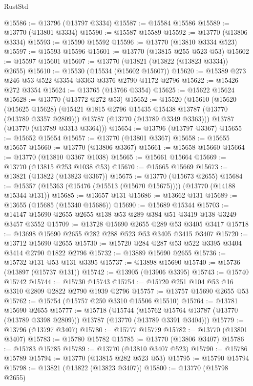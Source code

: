 \begin{lexlean}{RustStd}
\begin{coremodule}
@15586 := @13796 (@13797 @3334)
@15587 := @15584 @15586
@15589 := @13770 (@13801 @3334)
@15590 := @15587 @15589
@15592 := @13770 (@13806 @3334)
@15593 := @15590 @15592
@15596 := @13770 (@13810 @3334 @523)
@15597 := @15593 @15596
@15601 := @13770 (@13815 @255 @523 @53)
@15602 := @15597 @15601
@15607 := @13770 (@13821 (@13822 (@13823 @3334)) @2655)
@15610 := @15530 (@15534 (@15602 @15607))
@15620 := @15389 @273 @246 @53 @522 @3354 @3363 @3376 @2790 @1172 @2796
@15622 := @15426 @272 @3354
@15624 := @13765 (@13766 @3354)
@15625 := @15622 @15624
@15628 := @13770 (@13772 @272 @53)
@15652 := @15520
    (@15610
      (@15620
        (@15625 @15628)
        (@15421 @1815 @2796 @15435 @15438 @13787 (@13770 (@13789 @3357 @2809)))
        @13787
        (@13770 (@13789 @3349 @3363)))
      @13787
      (@13770 (@13789 @3313 @3364)))
@15654 := @13796 (@13797 @3367)
@15655 := @15652 @15654
@15657 := @13770 (@13801 @3367)
@15658 := @15655 @15657
@15660 := @13770 (@13806 @3367)
@15661 := @15658 @15660
@15664 := @13770 (@13810 @3367 @1038)
@15665 := @15661 @15664
@15669 := @13770 (@13815 @253 @1038 @53)
@15670 := @15665 @15669
@15673 := @13821 (@13822 (@13823 @3367))
@15675 := @13770 (@15673 @2655)
@15684 := @15357 (@15363 (@15476 (@15513 (@15670 @15675)))) (@13770 (@14188 @15344 @131))
@15685 := @13657 @131
@15686 := @13662 @131
@15689 := @13655 (@15685 (@15340 @15686))
@15690 := @15689 @15344
@15703 := @14147 @15690 @2655 @2655 @138 @53 @289 @384 @51 @3419 @138 @3249 @3457 @3552
@15709 := @13728 @15690 @2655 @289 @53 @3405 @3417
@15718 := @13698 @15690 @2655 @282 @288 @523 @53 @3405 @3415 @3407
@15720 := @13712 @15690 @2655
@15730 := @15720 @284 @287 @53 @522 @3395 @3404 @3414 @2790 @1822 @2796
@15732 := @13889 @15690 @2655
@15736 := @15732 @131 @53 @131 @3395
@15737 := @13898 @15690
@15740 := @15736 (@13897 (@15737 @131))
@15742 := @13905 (@13906 @3395)
@15743 := @15740 @15742
@15744 := @15730 @15743
@15754 := @15720 @251 @104 @53 @16 @3310 @2809 @2822 @2790 @1939 @2796
@15757 := @13757 @15690 @2655 @53
@15762 := @15754 (@15757 @250 @3310 @15506 @15510)
@15764 := @13781 @15690 @2655
@15777 := @15718
    (@15744
      (@15762 @15764 @13787 (@13770 (@13789 @3398 @2809)))
      @13787
      (@13770 (@13789 @3391 @3404)))
@15779 := @13796 (@13797 @3407)
@15780 := @15777 @15779
@15782 := @13770 (@13801 @3407)
@15783 := @15780 @15782
@15785 := @13770 (@13806 @3407)
@15786 := @15783 @15785
@15789 := @13770 (@13810 @3407 @523)
@15790 := @15786 @15789
@15794 := @13770 (@13815 @282 @523 @53)
@15795 := @15790 @15794
@15798 := @13821 (@13822 (@13823 @3407))
@15800 := @13770 (@15798 @2655)

\end{coremodule}
\end{lexlean}
